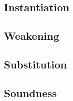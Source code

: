 
\subsection{Instantiation}


\subsection{Weakening}


\subsection{Substitution}


\subsection{Soundness}